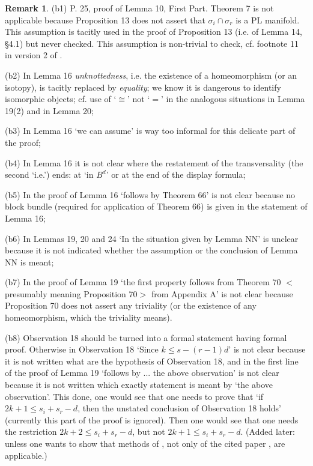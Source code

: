 \documentclass[12pt]{article}
\theoremstyle{plain}
\theoremstyle{definition}
\newtheorem{Remark}[Theorem]{Remark}
\begin{document}
{\begin{Remark}
(b1) P. 25, proof of Lemma 10, First Part.  Theorem 7 is not applicable because Proposition 13 does not
assert that $\sigma_i\cap\sigma_r$ is a PL manifold.
This assumption is tacitly used in the proof of Proposition 13 (i.e. of Lemma 14, \S4.1) but never checked.
This assumption is non-trivial to check, cf. footnote 11 in version 2 of \cite{AMSW}.

(b2) In Lemma 16 {\it unknottedness}, i.e. the existence of a homeomorphism (or an isotopy), is tacitly replaced by {\it equality}; we know it is dangerous to identify isomorphic objects; cf. use of `$\cong$' not `$=$' in the analogous situations in Lemma 19(2) and in Lemma 20;

(b3) In Lemma 16 `we can assume' is way too informal for this delicate part of the proof;

(b4) In Lemma 16 it is not clear where the restatement of the transversality (the second `i.e.') ends: at `in $B^d$' or at the end of the display formula;

(b5) In the proof of Lemma 16 `follows by Theorem 66' is not clear because no block bundle (required for application of Theorem 66) is given in the statement of Lemma 16;

(b6) In Lemmas 19, 20 and 24 `In the situation given by Lemma NN' is unclear because it is not indicated whether the assumption or the conclusion of Lemma NN is meant;

(b7) In the proof of Lemma 19 `the first property follows from Theorem 70 $<$presumably meaning Proposition 70$>$ from Appendix A' is not clear because Proposition 70 does not assert any triviality (or the existence of any homeomorphism, which the triviality means).

(b8) Observation 18 should be turned into a formal statement having formal proof.
Otherwise in Observation 18 `Since $k\le s-(r-1)d$' is not clear because
it is not written what are the hypothesis of Observation 18, and in the first line of the proof of Lemma 19
`follows by ... the above observation' is not clear because it is not written which exactly statement is meant by
`the above observation'.
This done, one would see that one needs to prove that `if $2k+1\le s_i+s_r-d$, then the unstated conclusion of Observation 18 holds' (currently this part of the proof is ignored).
Then one would see that one needs the restriction $2k+2\le s_i+s_r-d$, but  not $2k+1\le s_i+s_r-d$.
(Added later: unless one wants to show that methods of \cite{KM63}, not only of the cited paper \cite{Mi61},
are applicable.)


\end{Remark}}
\end{document}
